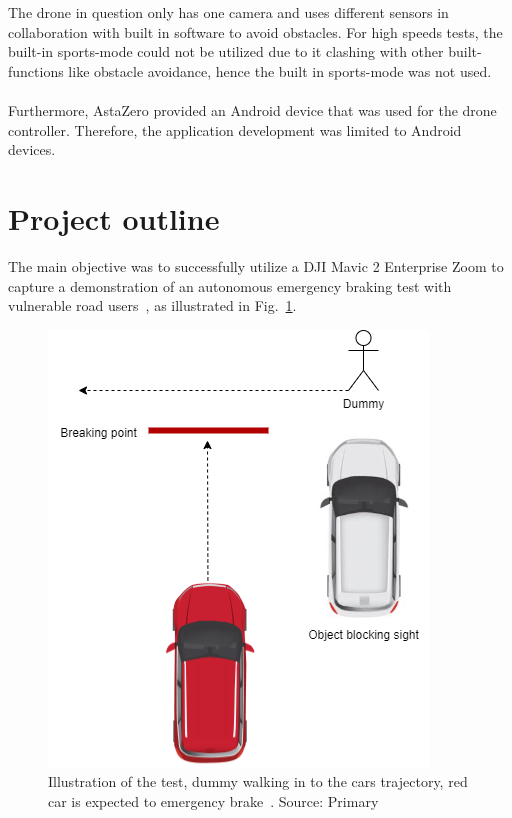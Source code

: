 \\ \\
The drone in question only has one camera and uses different sensors in collaboration with built in software to avoid obstacles. For high speeds tests, the built-in sports-mode could not be utilized due to it clashing with other built-functions like obstacle avoidance, hence the built in sports-mode was not used. 
\\ \\
Furthermore, AstaZero provided an Android device that was used for the drone controller. Therefore, the application development was limited to Android devices.

\section{Project outline} \label{sec:project outline}
The main objective was to successfully utilize a DJI Mavic 2 Enterprise Zoom to capture a demonstration of an autonomous emergency braking test with vulnerable road users~\cite{EuroNCAP2022TESTImplementationb}, as illustrated in Fig.~\ref{illustration_test}.

\begin{figure}[h!]
\centering
\includegraphics[scale=0.6,angle =0]{figure/test_illustration.png}
\caption{Illustration of the test, dummy walking in to the cars trajectory, red car is expected to emergency brake~\cite{EuroNCAP2021FILMPROTOCOL}. Source: Primary} 
\label{illustration_test}
\end{figure}

